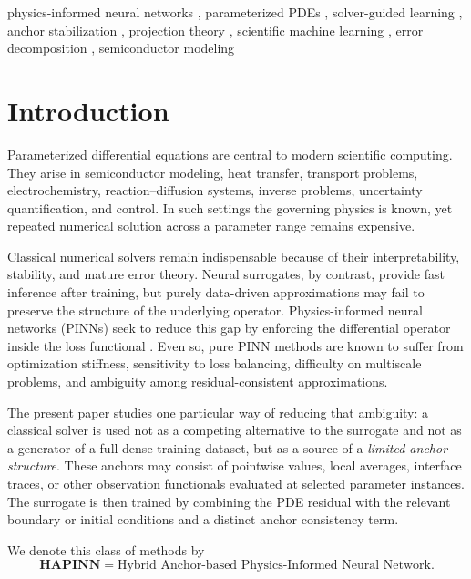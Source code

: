 \documentclass[preprint,12pt]{elsarticle}
\theoremstyle{definition}
\numberwithin{equation}{section}
\begin{document}
\begin{frontmatter}
\begin{keyword}
physics-informed neural networks \sep
parameterized PDEs \sep
solver-guided learning \sep
anchor stabilization \sep
projection theory \sep
scientific machine learning \sep
error decomposition \sep
semiconductor modeling
\end{keyword}

\end{frontmatter}

\section{Introduction}

Parameterized differential equations are central to modern scientific computing. They arise in semiconductor modeling, heat transfer, transport problems, electrochemistry, reaction--diffusion systems, inverse problems, uncertainty quantification, and control. In such settings the governing physics is known, yet repeated numerical solution across a parameter range remains expensive.

Classical numerical solvers remain indispensable because of their interpretability, stability, and mature error theory. Neural surrogates, by contrast, provide fast inference after training, but purely data-driven approximations may fail to preserve the structure of the underlying operator. Physics-informed neural networks (PINNs) seek to reduce this gap by enforcing the differential operator inside the loss functional \cite{Raissi2019,Karniadakis2021}. Even so, pure PINN methods are known to suffer from optimization stiffness, sensitivity to loss balancing, difficulty on multiscale problems, and ambiguity among residual-consistent approximations.

The present paper studies one particular way of reducing that ambiguity: a classical solver is used not as a competing alternative to the surrogate and not as a generator of a full dense training dataset, but as a source of a \emph{limited anchor structure}. These anchors may consist of pointwise values, local averages, interface traces, or other observation functionals evaluated at selected parameter instances. The surrogate is then trained by combining the PDE residual with the relevant boundary or initial conditions and a distinct anchor consistency term.

We denote this class of methods by
\[
\textbf{HAPINN}=\text{Hybrid Anchor-based Physics-Informed Neural Network}.
\]
\end{document}
